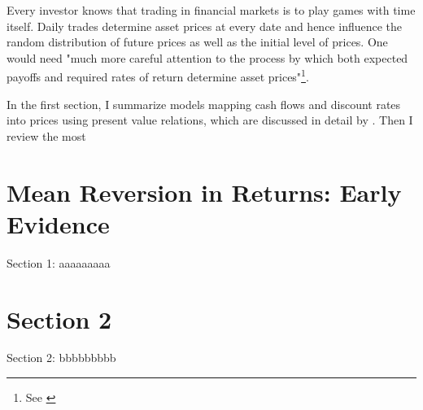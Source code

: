 \minitoc

\vspace{0.5cm}
Every investor knows that trading in financial markets is to play
games with time itself. Daily trades determine asset prices at every date and hence
influence the random distribution of future prices as well as the initial
level of prices. One would need "much more careful attention to the process
by which both expected payoffs and required rates of return determine
asset prices"\footnote{See \cite[p.~121]{campbell2017financial}}.

In the first section, I summarize models mapping cash flows and discount rates
into prices using present value relations, which are discussed in detail by
\citet[Chapter~5]{campbell2017financial}. Then I review the most 

\section{Mean Reversion in Returns: Early Evidence}
Section 1: aaaaaaaaa

\section{Section 2}
Section 2: bbbbbbbbb